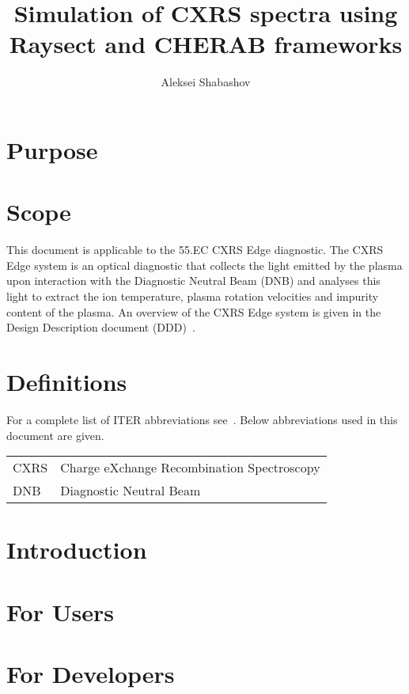 \documentclass[a4paper,12pt,titlepage,english,final]{article}
\title{Simulation of CXRS spectra using Raysect and CHERAB frameworks}
\author{Aleksei Shabashov}
\date{}
\begin{document}
\maketitle
\tableofcontents

\section{Purpose}%
\label{sec:purpose}


\section{Scope}%
\label{sec:scope}
This document is applicable to the 55.EC CXRS Edge diagnostic. The CXRS Edge system is an optical diagnostic that collects the light emitted by the plasma upon interaction with the Diagnostic Neutral Beam (DNB) and analyses this light to extract the ion temperature, plasma rotation velocities and impurity content of the plasma. An overview of the CXRS Edge system is given in the Design Description document (DDD)~\cite{ddd_cxrs_edge}.


\section{Definitions}%
\label{sec:definitions}

For a complete list of ITER abbreviations see~\cite{iter_abbr}. Below abbreviations used in this document are given.

\begin{table}[ht]
    \begin{tabular}{l l}
        CXRS & Charge eXchange Recombination Spectroscopy \\
        DNB  & Diagnostic Neutral Beam                    \\
    \end{tabular}
\end{table}

\section{Introduction}%
\label{sec:introduction}


\section{For Users}%
\label{sec:users}



\section{For Developers}%
\label{sec:developers}


\printbibliography%
\end{document}
